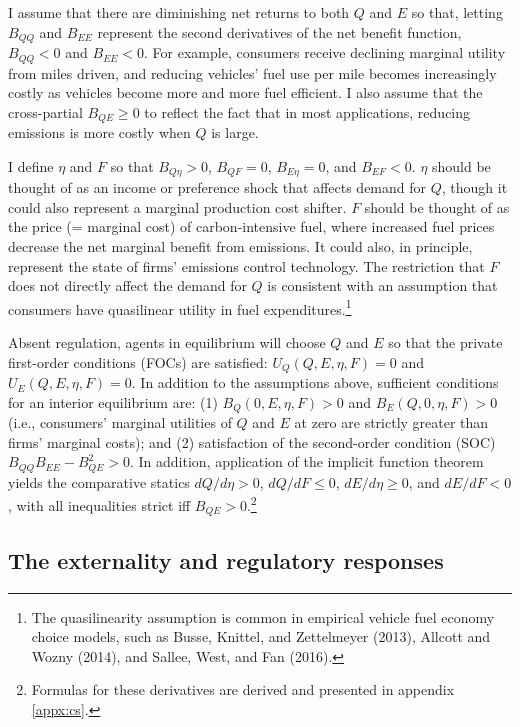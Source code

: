 \documentclass[12pt]{article}
\begin{document}
I assume that there are diminishing net returns to both $Q$ and $E$ so that, letting $B_{QQ}$ and $B_{EE}$ represent the second derivatives of the net benefit function, $B_{QQ}<0$ and $B_{EE}<0$. For example, consumers receive declining marginal utility from miles driven, and reducing vehicles' fuel use per mile becomes increasingly costly as vehicles become more and more fuel efficient. I also assume that the cross-partial $B_{QE}\geq0$ to reflect the fact that in most applications, reducing emissions is more costly when $Q$ is large.

I define $\eta$ and $F$ so that $B_{Q\eta}>0$, $B_{QF}=0$, $B_{E\eta}=0$, and $B_{EF}<0$. $\eta$ should be thought of as an income or preference shock that affects demand for $Q$, though it could also represent a marginal production cost shifter. $F$ should be thought of as the price (= marginal cost) of carbon-intensive fuel, where increased fuel prices decrease the net marginal benefit from emissions. It could also, in principle, represent the state of firms' emissions control technology. The restriction that $F$ does not directly affect the demand for $Q$ is consistent with an assumption that consumers have quasilinear utility in fuel expenditures.\footnote{The quasilinearity assumption is common in empirical vehicle fuel economy choice models, such as Busse, Knittel, and Zettelmeyer (2013), Allcott and Wozny (2014), and Sallee, West, and Fan (2016).}

Absent regulation, agents in equilibrium will choose $Q$ and $E$ so that the private first-order conditions (FOCs) are satisfied: $U_Q(Q,E,\eta,F)=0$ and $U_E(Q,E,\eta,F)=0$. In addition to the assumptions above, sufficient conditions for an interior equilibrium are: (1) $B_Q(0,E,\eta,F)>0$ and $B_E(Q,0,\eta,F)>0$ (i.e., consumers' marginal utilities of $Q$ and $E$ at zero are strictly greater than firms' marginal costs); and (2) satisfaction of the second-order condition (SOC) $B_{QQ}B_{EE}-B_{QE}^2>0$. In addition, application of the implicit function theorem yields the comparative statics $dQ/d\eta>0$, $dQ/dF\leq0$, $dE/d\eta\geq0$, and $dE/dF<0$, with all inequalities strict iff $B_{QE}>0$.\footnote{Formulas for these derivatives are derived and presented in appendix \ref{appx:cs}.}

\subsection{The externality and regulatory responses} \label{sec:externality}
\end{document}
